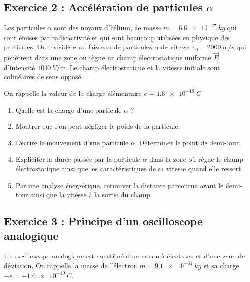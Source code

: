 \subsection{Exercice 2 : Accélération de particules $\alpha$}

Les particules $\alpha$ sont des noyaux d'hélium, de masse $m = \SI{6.6e-27}{kg}$ qui sont émises par radioactivité et qui sont beaucoup utilisées en physique des particules. On considère un faisceau de particules $\alpha$ de vitesse $v_0 = \SI{2000}{\meter\per\second}$ qui pénètrent dans une zone où règne un champ électrostatique uniforme $\vec{E}$ d'intensité $\SI{1000}{V\per\meter}$. Le champ électrostatique et la vitesse initiale sont colinéaires de sens opposé. 

On rappelle la valeur de la charge élémentaire  $e = \SI{1.6e-19}{C}$

\begin{enumerate}
	\item Quelle est la charge d'une particule $\alpha$ ?
	\item Montrer que l'on peut négliger le poids de la particule.
	\item Décrire le mouvement d'une particule $\alpha$. Déterminer le point de demi-tour.
	\item Expliciter la durée passée par la particule $\alpha$ dans la zone où règne le champ électrostatique ainsi que les caractéristiques de sa vitesse quand elle ressort.
	\item Par une analyse énergétique, retrouver la distance parcourue avant le demi-tour ainsi que la vitesse à la sortie du champ.
\end{enumerate}

\subsection{Exercice 3 : Principe d'un oscilloscope analogique}

Un oscilloscope analogique est constitué d'un canon à électrons et d'une zone de déviation. On rappelle la masse de l'électron $m = \SI{9.1e-31}{kg}$ et sa charge $-e = -\SI{1.6e-19}{C}$. 


